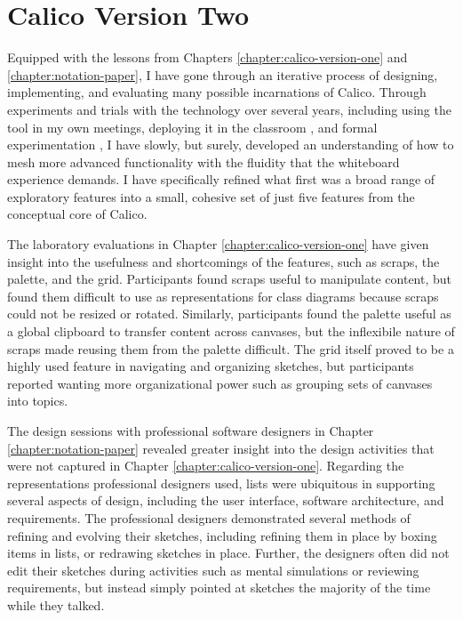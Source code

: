 \chapter{Calico Version Two}
\label{chapter:calico-version-two}

Equipped with the lessons from Chapters \ref{chapter:calico-version-one} and \ref{chapter:notation-paper}, I have gone through an iterative process of designing, implementing, and evaluating many possible incarnations of Calico. Through experiments and trials with the technology over several years, including using the tool in my own meetings, deploying it in the classroom \cite{Loksa2013}, and formal experimentation \cite{mangano2012design}, I have slowly, but surely, developed an understanding of how to mesh more advanced functionality with the fluidity that the whiteboard experience demands. I have specifically refined what first was a broad range of exploratory features into a small, cohesive set of just five features from the conceptual core of Calico.

The laboratory evaluations in Chapter \ref{chapter:calico-version-one} have given insight into the usefulness and shortcomings of the features, such as scraps, the palette, and the grid. Participants found scraps useful to manipulate content, but found them difficult to use as representations for class diagrams because scraps could not be resized or rotated. Similarly, participants found the palette useful as a global clipboard to transfer content across canvases, but the inflexibile nature of scraps made reusing them from the palette difficult. The grid itself proved to be a highly used feature in navigating and organizing sketches, but participants reported wanting more organizational power such as grouping sets of canvases into topics.

The design sessions with professional software designers in Chapter \ref{chapter:notation-paper} revealed greater insight into the design activities that were not captured in Chapter \ref{chapter:calico-version-one}. Regarding the representations professional designers used, lists were ubiquitous in supporting several aspects of design, including the user interface, software architecture, and requirements. The professional designers demonstrated several methods of refining and evolving their sketches, including refining them in place by boxing items in lists, or redrawing sketches in place. Further, the designers often did not edit their sketches during activities such as mental simulations or reviewing requirements, but instead simply pointed at sketches the majority of the time while they talked.

